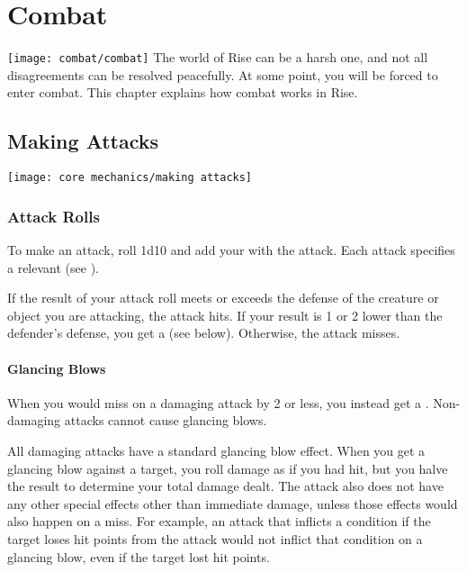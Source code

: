 \chapter{Combat}\label{Combat}
    \texttt{[image: combat/combat]}
    The world of Rise can be a harsh one, and not all disagreements can be resolved peacefully.
    At some point, you will be forced to enter combat.
    This chapter explains how combat works in Rise.

\section{Making Attacks}\label{Attacks}
    \texttt{[image: core mechanics/making attacks]}

    \subsection{Attack Rolls}\label{Attack Rolls}
        To make an attack, roll 1d10 and add your  with the attack.
        Each attack specifies a relevant  (see ).

        If the result of your attack roll meets or exceeds the defense of the creature or object you are attacking, the attack hits.
        If your result is 1 or 2 lower than the defender's defense, you get a  (see below).
        Otherwise, the attack misses.

        \subsubsection{Glancing Blows}\label{Glancing Blows}
            When you would miss on a damaging attack by 2 or less, you instead get a .
            Non-damaging attacks cannot cause glancing blows.

            All damaging attacks have a standard glancing blow effect.
            When you get a glancing blow against a target, you roll damage as if you had hit, but you halve the result to determine your total damage dealt.
            The attack also does not have any other special effects other than immediate damage, unless those effects would also happen on a miss.
            For example, an attack that inflicts a condition if the target loses hit points from the attack would not inflict that condition on a glancing blow, even if the target lost hit points.

